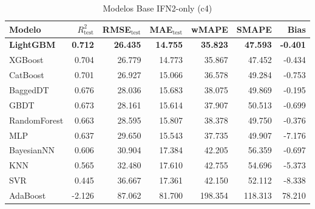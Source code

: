 \begin{table}[H]
    \centering
    \caption{Modelos Base IFN2-only (c4)}
    \label{tab:base_ifn2_c4}
    \begin{tabular}{lrrrrrr}
        \toprule
        Modelo & $R^2_{\text{test}}$ & RMSE$_{\text{test}}$ & MAE$_{\text{test}}$ & wMAPE & SMAPE & Bias \\
        \midrule
        \textbf{LightGBM} & \textbf{0.712} & \textbf{26.435} & \textbf{14.755} & \textbf{35.823} & \textbf{47.593} & \textbf{-0.401} \\
        XGBoost & 0.704 & 26.779 & 14.773 & 35.867 & 47.452 & -0.434 \\
        CatBoost & 0.701 & 26.927 & 15.066 & 36.578 & 49.284 & -0.753 \\
        BaggedDT & 0.676 & 28.036 & 15.683 & 38.075 & 49.869 & -0.195 \\
        GBDT & 0.673 & 28.161 & 15.614 & 37.907 & 50.513 & -0.699 \\
        RandomForest & 0.663 & 28.595 & 15.807 & 38.378 & 49.750 & -0.376 \\
        MLP & 0.637 & 29.650 & 15.543 & 37.735 & 49.907 & -7.176 \\
        BayesianNN & 0.606 & 30.904 & 17.384 & 42.205 & 56.359 & -0.697 \\
        KNN & 0.565 & 32.480 & 17.610 & 42.755 & 54.696 & -5.373 \\
        SVR & 0.445 & 36.667 & 17.361 & 42.150 & 52.112 & -8.338 \\
        AdaBoost & -2.126 & 87.062 & 81.700 & 198.354 & 118.313 & 78.210 \\
        \bottomrule
    \end{tabular}
\end{table}

